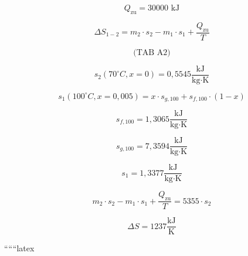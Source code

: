 \[
Q_{\text{zu}} = 30000 \text{ kJ}
\]

\[
\Delta S_{1-2} = m_2 \cdot s_2 - m_1 \cdot s_1 + \frac{Q_{\text{zu}}}{T}
\]

\[
\text{(TAB A2)}
\]

\[
s_2 (70^\circ C, x = 0) = 0,5545 \frac{\text{kJ}}{\text{kg} \cdot \text{K}}
\]

\[
s_1 (100^\circ C, x = 0,005) = x \cdot s_{g,100} + s_{f,100} \cdot (1-x)
\]

\[
s_{f,100} = 1,3065 \frac{\text{kJ}}{\text{kg} \cdot \text{K}}
\]

\[
s_{g,100} = 7,3594 \frac{\text{kJ}}{\text{kg} \cdot \text{K}}
\]

\[
s_1 = 1,3377 \frac{\text{kJ}}{\text{kg} \cdot \text{K}}
\]

\[
m_2 \cdot s_2 - m_1 \cdot s_1 + \frac{Q_{\text{zu}}}{T} = 5355 \cdot s_2
\]

\[
\Delta S = 1237 \frac{\text{kJ}}{\text{K}}
\]

``````latex


